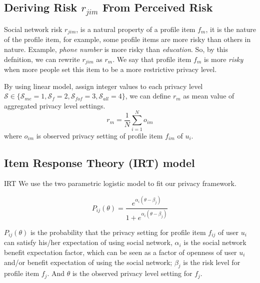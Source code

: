 \documentclass[a4paper]{article}
\begin{document}
\subsection{Deriving Risk $r_{jim}$ From Perceived Risk}
Social network risk $r_{jim}$, is a natural property of a profile item
$f_{m}$, it is the nature of the profile item, for example, some
profile items are more risky than others in nature. Example,
\emph{phone number} is more risky than \emph{education}. So, by this
defnition, we can rewrite $r_{jim}$ as $r_m$. We say that profile item
$f_m$ is more \emph{risky} when more people set this item to be a more
restrictive privacy level. 

By using linear model, assign integer values to each privacy level
$\mathcal{S}\in \{\mathcal{S}_{me}=1, \mathcal{S}_{f}=2,
\mathcal{S}_{fof}=3, \mathcal{S}_{all}=4\}$, we can define $r_m$ as
mean value of aggregated privacy level settings. 
\[ r_m = \frac{1}{N} \sum_{i=1}^No_{im} \]
where $o_{im}$ is observed privacy setting of profile item $f_{im}$
of $u_i$. 

\subsection{Item Response Theory (IRT) model}
IRT 
We use the two parametric logistic model to fit our privacy framework. 

\[ P_{ij}(\theta) = \frac{e^{\alpha_i(\theta - \beta_j)}}
{1+e^{\alpha_i(\theta - \beta_j)}} \]

$P_{ij}(\theta)$ is the probability that the privacy setting for
profile item $f_{ij}$ of user $u_i$
can satisfy his/her expectation of using social network,
$\alpha_i$ is the social network benefit expectation 
factor, which can be seen as a factor of openness of user $u_i$ and/or
benefit expectation of using the social network; $\beta_j$ is the risk
level for profile item $f_j$. And $\theta$ is the observed privacy
level setting for $f_j$.
\end{document}
